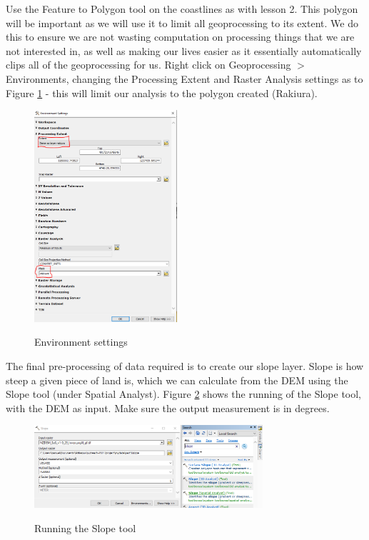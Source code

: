\documentclass{article}
\begin{document}
Use the Feature to Polygon tool on the coastlines as with lesson 2. This polygon will be important as we will use it to limit all geoprocessing to its extent. We do this to ensure we are not wasting computation on processing things that we are not interested in, as well as making our lives easier as it essentially automatically clips all of the geoprocessing for us. Right click on Geoprocessing $>$ Environments, changing the Processing Extent and Raster Analysis settings as to Figure \ref{3_environments} - this will limit our analysis to the polygon created (Rakiura).
\pagebreak

\begin{figure}[h]
  \centering
  \caption{Environment settings}
  \includegraphics[width=200px]{images/part3/environments.PNG}
  \label{3_environments}
\end{figure}

The final pre-processing of data required is to create our slope layer. Slope is how steep a given piece of land is, which we can calculate from the DEM using the Slope tool (under Spatial Analyst). Figure \ref{3_slope} shows the running of the Slope tool, with the DEM as input. Make sure the output measurement is in degrees. \\

\begin{figure}[h]
  \centering
  \caption{Running the Slope tool}
  \includegraphics[width=320px]{images/part3/slope.PNG}
  \label{3_slope}
\end{figure}
\pagebreak
\end{document}
